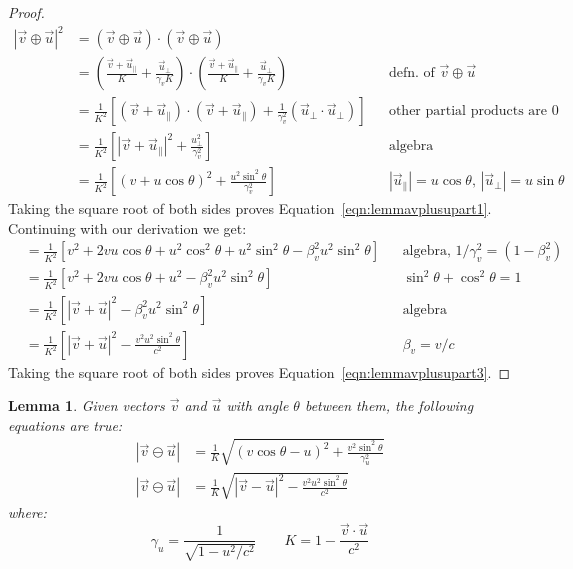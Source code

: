\documentclass[a4paper]{article}
\theoremstyle{plain}
\newtheorem{lemma}[theorem]{Lemma}
\theoremstyle{definition}
\newcommand{\vect}[1]{\vec{#1}}
\begin{document}
\begin{proof}
\begin{align*}
|\vect{v} \oplus \vect{u}|^2
  & = (\vect{v} \oplus \vect{u}) \cdot (\vect{v} \oplus \vect{u}) \\
  & = (\frac{ \vect{v} + \vect{u}_{\parallel} }{K} + \frac{\vect{u}_{\perp}}{\gamma_v K}) \cdot (\frac{ \vect{v} + \vect{u}_{\parallel} }{K} + \frac{\vect{u}_{\perp}}{\gamma_v K}) & & \text{defn. of $\vect{v} \oplus \vect{u}$} \\
  & = \frac{1}{K^2} \left[ (\vect{v} + \vect{u}_{\parallel}) \cdot (\vect{v} + \vect{u}_{\parallel}) + \frac{1}{\gamma_v^2} (\vect{u}_{\perp} \cdot \vect{u}_{\perp}) \right] & & \text{other partial products are 0} \\
  & = \frac{1}{K^2} \left[ |\vect{v} + \vect{u}_{\parallel}|^2 + \frac{u_{\perp}^2}{\gamma_v^2} \right] & & \text{algebra} \\
  & = \frac{1}{K^2} \left[ (v + u \cos \theta)^2 + \frac{u^2 \sin^2 \theta}{\gamma_v^2} \right] & & \text{$|\vect{u}_{\parallel}| = u \cos \theta$, $|\vect{u}_{\perp}| = u \sin \theta$}
\end{align*}
Taking the square root of both sides proves
Equation~\eqref{eqn:lemmavplusupart1}.
Continuing with our derivation we get:
\begin{align*}
  & = \frac{1}{K^2} \left[ v^2 + 2vu \cos \theta + u^2 \cos^2 \theta + u^2 \sin^2 \theta - \beta_v^2 u^2 \sin^2 \theta \right] & & \text{algebra, $1/\gamma_v^2 = (1-\beta_v^2)$} \\
  & = \frac{1}{K^2} \left[ v^2 + 2vu \cos \theta + u^2 - \beta_v^2 u^2 \sin^2 \theta \right] & & \text{$\sin^2 \theta + \cos^2 \theta = 1$} \\
  & = \frac{1}{K^2} \left[ |\vect{v} + \vect{u}|^2 - \beta_v^2 u^2 \sin^2 \theta \right] & & \text{algebra} \\
  & = \frac{1}{K^2} \left[ |\vect{v} + \vect{u}|^2 - \frac{v^2 u^2 \sin^2 \theta}{c^2} \right] & & \text{$\beta_v = v/c$}
\end{align*}
Taking the square root of both sides proves
Equation~\eqref{eqn:lemmavplusupart3}.
\end{proof}

\begin{lemma}
\label{lem:magnitudeRelVecMinus1}
Given vectors $\vect{v}$ and $\vect{u}$
with angle $\theta$ between them,
the following equations are true:
\begin{align}
|\vect{v} \ominus \vect{u}|
  & = \frac{1}{K} \sqrt{(v \cos \theta - u)^2 + \frac{v^2 \sin^2 \theta}{\gamma_u^2}} \label{eqn:lemmavminusupart1} \\
|\vect{v} \ominus \vect{u}|
  & = \frac{1}{K} \sqrt{|\vect{v} - \vect{u}|^2 - \frac{v^2 u^2 \sin^2 \theta}{c^2}} \label{eqn:lemmavminusupart3}
\end{align}
where:
\begin{equation}
\gamma_u = \frac{1}{\sqrt{1-u^2/c^2}}  \qquad
K = 1 - \frac{\vect{v} \cdot \vect{u}}{c^2} \nonumber
\end{equation}
\end{lemma}
\end{document}
